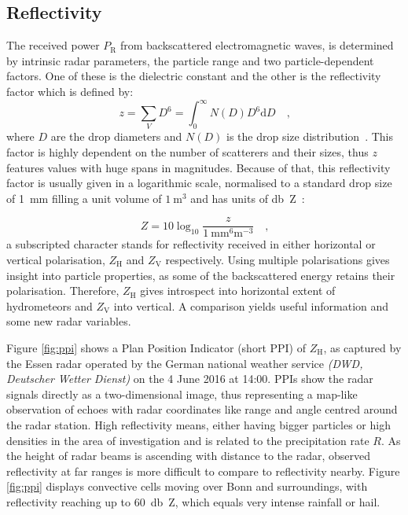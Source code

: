 \subsection{Reflectivity}
The received power $P_\text{R}$ from backscattered electromagnetic waves, is determined by intrinsic radar parameters, the particle range and two particle-dependent factors. One of these is the dielectric constant and the other is the reflectivity factor which is defined by:
\begin{equation}
z = \sum_V D^6 = \int_{0}^{\infty} N(D)D^6 \mathrm{d}D \quad \text{,}
\end{equation}
where $D$ are the drop diameters and $N(D)$ is the drop size distribution~\cite[p. 190]{yau1996short}. This factor is highly dependent on the number of scatterers and their sizes, thus $z$ features values with huge spans in magnitudes. Because of that, this reflectivity factor is usually given in a logarithmic scale, normalised to a standard drop size of \SI{1}{\milli\metre} filling a unit volume of $\SI{1}{\metre^3}$ and has units of \si{\decibel Z}~\cite{meischner2005weather}:

\begin{equation}
\label{eq:reflectivity}
Z = 10 \log_{10} \dfrac{z}{\SI{1}{\milli\metre^6 \metre^{-3}}} \quad \text{,}
\end{equation}
a subscripted character stands for reflectivity received in either horizontal or vertical polarisation, $Z_\text{H}$ and $Z_\text{V}$ respectively. 
Using multiple polarisations gives insight into particle properties, as some of the backscattered energy retains their polarisation.
Therefore, $Z_\text{H}$ gives introspect into horizontal extent of hydrometeors and $Z_\text{V}$ into vertical. A comparison yields useful information and some new radar variables.

Figure \ref{fig:ppi} shows a Plan Position Indicator (short PPI) of $Z_\text{H}$, as captured by the Essen radar operated by the German national weather service \emph{(DWD, Deutscher Wetter Dienst)} on the 4 June 2016 at 14:00. 
PPIs show the radar signals directly as a two-dimensional image, thus representing a map-like observation of echoes with radar coordinates like range and angle centred around the radar station.  
High reflectivity means, either having bigger particles or high densities in the area of investigation and is related to the precipitation rate $R$.
As the height of radar beams is ascending with distance to the radar, observed reflectivity at far ranges is more difficult to compare to reflectivity nearby. 
Figure \ref{fig:ppi} displays convective cells moving over Bonn and surroundings, with reflectivity reaching up to \SI{60}{\decibel Z}, which equals very intense rainfall or hail.

